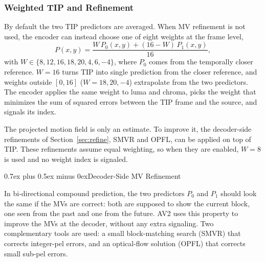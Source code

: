 \documentclass[journal]{IEEEtran}
\makeatletter
\def\subsection{\@startsection{subsection}{2}{\z@}{2.5ex plus 1ex minus 1ex}%
{0.7ex plus 0.5ex minus 0ex}{\normalfont\normalsize\itshape}}%
\makeatother
\begin{document}
\subsubsection{Weighted TIP and Refinement}
By default the two TIP predictors are averaged. When MV refinement is not
used, the encoder can instead choose one of eight weights at the frame level,
\begin{equation}
  P(x,y) = \frac{W\,P_0(x,y) + (16-W)\,P_1(x,y)}{16},
  \label{eq:tip_weight}
\end{equation}
with $W\in\{8, 12, 16, 18, 20, 4, 6, -4\}$, where $P_0$ comes from the
temporally closer reference. $W=16$ turns TIP into single prediction from the
closer reference, and weights outside $[0,16]$ ($W=18, 20, -4$) extrapolate
from the two predictors. The encoder applies the same weight to
luma and chroma, picks the weight that minimizes the sum of squared errors
between the TIP frame and the source, and signals its index.

The projected motion field is only an estimate. To improve it, the
decoder-side refinements of Section~\ref{sec:refine}, SMVR and OPFL, can be
applied on top of TIP. These refinements assume equal weighting, so when they
are enabled, $W=8$ is used and no weight index is signaled.

\subsection{Decoder-Side MV Refinement}
\label{sec:refine}

In bi-directional compound prediction, the two predictors $P_0$ and $P_1$
should look the same if the MVs are correct: both are supposed to show the
current block, one seen from the past and one from the future. AV2 uses this
property to improve the MVs at the decoder, without any extra signaling. Two
complementary tools are used: a small block-matching search (SMVR) that
corrects integer-pel errors, and an optical-flow solution (OPFL) that
corrects small sub-pel errors.
\end{document}
